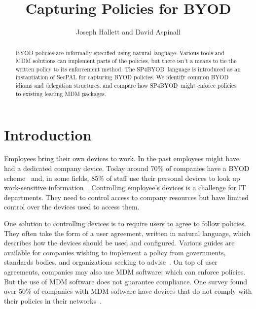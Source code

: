 \documentclass{llncs}
\title{Capturing Policies for BYOD}
\author{Joseph Hallett and David Aspinall}
\institute{University of Edinburgh}
\newcommand{\AppPAL}[0]{SP4BYOD}
\begin{document}
\maketitle
\begin{abstract}
  BYOD policies are informally specified using natural language.
  Various tools and \ac{MDM} solutions can implement parts of the policies, but there isn't a means to tie the written policy to its enforcement method.
  The \AppPAL~language is introduced as an instantiation of SecPAL for capturing BYOD policies.
  We identify common BYOD idioms and delegation structures, and compare how \AppPAL~might enforce policies to existing leading MDM packages.
\end{abstract}
\section{Introduction}
\label{sec:intro}

Employees bring their own devices to work.
In the past employees might have had a dedicated company device.
Today around 70\% of companies have a BYOD scheme~\cite{schulze_byod_2016} and, in some fields,
  85\% of staff use their personal devices to look up work-sensitive information~\cite{patel_uk_2015}.
Controlling employee's devices is a challenge for IT departments.
They need to control access to company resources but have limited control over the devices used to access them.

One solution to controlling devices is to require users to agree to follow policies.
They often take the form of a user agreement, written in natural language, which describes how the devices should be used and configured.
Various guides are available for companies wishing to implement a policy from governments, standards bodies, and organizations seeking to advise~\cite{nicholas_r._c._guerin_security_2008,souppaya_guidelines_????,hp_byod_????,cesg_byod_2015}.
On top of user agreements, companies may also use \ac{MDM} software; which can enforce policies.
But the use of \ac{MDM} software does not guarantee compliance.
One survey found over 50\% of companies with \ac{MDM} software have devices that do not comply with their policies in their networks~\cite{mobileiron_security_labs_q4_2015}.
\end{document}
